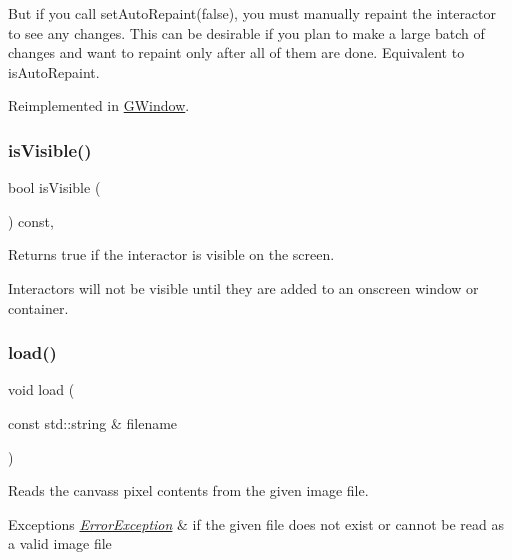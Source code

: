 But if you call set\+Auto\+Repaint(false), you must manually repaint the interactor to see any changes. This can be desirable if you plan to make a large batch of changes and want to repaint only after all of them are done. Equivalent to is\+Auto\+Repaint. 

Reimplemented in \mbox{\hyperlink{classGWindow_ae88344ee919d3d3de6e38a8381faf209}{G\+Window}}.

\mbox{\label{classGInteractor_a9d8a6cfb13917785c143e74d40e4e2be}} 
\subsubsection{\texorpdfstring{is\+Visible()}{isVisible()}}
{\footnotesize\ttfamily bool is\+Visible (\begin{DoxyParamCaption}{ }\end{DoxyParamCaption}) const\hspace{0.3cm}{\ttfamily [virtual]}, {\ttfamily [inherited]}}



Returns true if the interactor is visible on the screen. 

Interactors will not be visible until they are added to an onscreen window or container. \mbox{\label{classGCanvas_a6c21edd9d285c925527e3209fca54b01}} 
\subsubsection{\texorpdfstring{load()}{load()}}
{\footnotesize\ttfamily void load (\begin{DoxyParamCaption}\item[{const std\+::string \&}]{filename }\end{DoxyParamCaption})\hspace{0.3cm}{\ttfamily [virtual]}}



Reads the canvas\textquotesingle{}s pixel contents from the given image file. 


\begin{DoxyExceptions}{Exceptions}
{\em \mbox{\hyperlink{classErrorException}{Error\+Exception}}} & if the given file does not exist or cannot be read as a valid image file \\
\hline
\end{DoxyExceptions}
\mbox{\label{classGCanvas_a49dc57a2ce4caa354a5fff6acdde2e7d}} 
